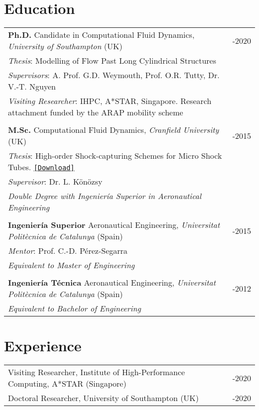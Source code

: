 \documentclass[line]{res}
\newenvironment{p1}
  {\begin{adjustwidth}{-16pt}{0pt}
  \vspace{1pt}}
  {\end{adjustwidth}}
\newenvironment{p3}
  {\begin{adjustwidth}{-16pt}{0pt}
  \vspace{3pt}}
  {\end{adjustwidth}}
\begin{document}
\begin{resume}
\section{Education}
\begin{p3}
\begin{tabular}{p{} >{\raggedleft\arraybackslash}p{}}
\textbf{Ph.D.} Candidate in Computational Fluid Dynamics, \textit{University of Southampton} (UK) &  2015-2020\\
\textit{Thesis}: Modelling of Flow Past Long Cylindrical Structures & \\
\textit{Supervisors}: A. Prof. G.D. Weymouth, Prof. O.R. Tutty, Dr. V.-T. Nguyen & \\
\textit{Visiting Researcher}: IHPC, A*STAR, Singapore. Research attachment funded by the ARAP mobility scheme&  \\
\\
\textbf{M.Sc.} Computational Fluid Dynamics, \textit{Cranfield University} (UK) &  2014-2015\\ 
\textit{Thesis}: High-order Shock-capturing Schemes for Micro Shock Tubes. \href{https://b-fg.github.io/thesis/Font_Garcia 2015 - High-order Shock-capturing Schemes for Micro Shock Tubes.pdf}{\texttt{[Download]}}& \\
\textit{Supervisor}: Dr. L. K\"{o}n\"{o}zsy & \\
\textit{Double Degree with Ingenier\'{i}a Superior in Aeronautical Engineering} & \\
\\
\textbf{Ingenier\'{i}a Superior} Aeronautical Engineering, \textit{Universitat Polit\`{e}cnica de Catalunya} (Spain) &  2012-2015\\ 
\textit{Mentor}: Prof. C.-D. P\'{e}rez-Segarra & \\
\textit{Equivalent to Master of Engineering} & \\
\\
\textbf{Ingenier\'{i}a T\'{e}cnica} Aeronautical Engineering, \textit{Universitat Polit\`{e}cnica de Catalunya} (Spain) &  2009-2012\\ 
\textit{Equivalent to Bachelor of Engineering} & 
\end{tabular}
\end{p3}

\section{Experience}
\begin{p1}
\begin{tabular}{p{} >{\raggedleft\arraybackslash}p{}}
Visiting Researcher, Institute of High-Performance Computing, A*STAR (Singapore) & 2017-2020\\
Doctoral Researcher, University of Southampton (UK) & 2015-2020
\end{tabular}
\end{p1}
 

\end{resume}
\end{document}
